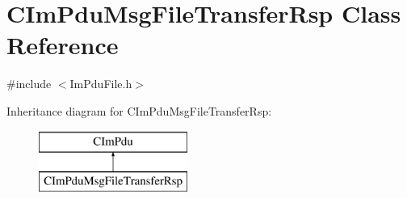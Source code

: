 \hypertarget{class_c_im_pdu_msg_file_transfer_rsp}{}\section{C\+Im\+Pdu\+Msg\+File\+Transfer\+Rsp Class Reference}
\label{class_c_im_pdu_msg_file_transfer_rsp}


{\ttfamily \#include $<$Im\+Pdu\+File.\+h$>$}

Inheritance diagram for C\+Im\+Pdu\+Msg\+File\+Transfer\+Rsp\+:\begin{figure}[H]
\begin{center}
\leavevmode
\includegraphics[height=2.000000cm]{class_c_im_pdu_msg_file_transfer_rsp}
\end{center}
\end{figure}

